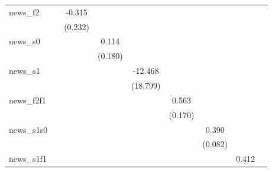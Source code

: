 {\begin{tabular}{l*{8}{c}}
\addlinespace
news\_f2     &                     &      -0.315         &                     &                     &                     &                     &                     &                     \\
            &                     &     (0.232)         &                     &                     &                     &                     &                     &                     \\
\addlinespace
news\_s0     &                     &                     &       0.114         &                     &                     &                     &                     &                     \\
            &                     &                     &     (0.180)         &                     &                     &                     &                     &                     \\
\addlinespace
news\_s1     &                     &                     &                     &     -12.468         &                     &                     &                     &                     \\
            &                     &                     &                     &    (18.799)         &                     &                     &                     &                     \\
\addlinespace
news\_f2f1   &                     &                     &                     &                     &       0.563\sym{***}&                     &                     &                     \\
            &                     &                     &                     &                     &     (0.170)         &                     &                     &                     \\
\addlinespace
news\_s1s0   &                     &                     &                     &                     &                     &       0.390\sym{***}&                     &                     \\
            &                     &                     &                     &                     &                     &     (0.082)         &                     &                     \\
\addlinespace
news\_s1f1   &                     &                     &                     &                     &                     &                     &       0.412\sym{**} &                     \\

\end{tabular}}

